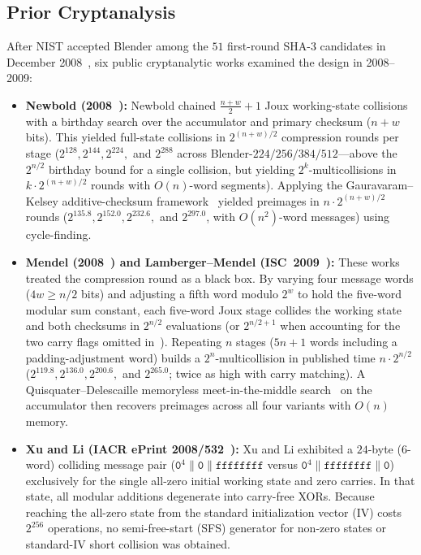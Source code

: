 \documentclass[11pt,a4paper]{article}
\theoremstyle{definition}
\theoremstyle{remark}
\begin{document}
\subsection{Prior Cryptanalysis}
After NIST accepted Blender among the $51$ first-round SHA-3 candidates in December 2008~\cite{NIST09}, six public cryptanalytic works examined the design in 2008--2009:
\begin{itemize}[leftmargin=2em]
    \item \textbf{Newbold (2008~\cite{New08}):} Newbold chained $\frac{n+w}{2} + 1$ Joux working-state collisions~\cite{Jou04} with a birthday search over the accumulator and primary checksum ($n + w$ bits). This yielded full-state collisions in $2^{(n+w)/2}$ compression rounds per stage ($2^{128}, 2^{144}, 2^{224},$ and $2^{288}$ across Blender-$224/256/384/512$---above the $2^{n/2}$ birthday bound for a single collision, but yielding $2^k$-multicollisions in $k \cdot 2^{(n+w)/2}$ rounds with $O(n)$-word segments). Applying the Gauravaram--Kelsey additive-checksum framework~\cite{GK08} yielded preimages in $n \cdot 2^{(n+w)/2}$ rounds ($2^{135.8}, 2^{152.0}, 2^{232.6},$ and $2^{297.0}$, with $O(n^2)$-word messages) using cycle-finding.
    \item \textbf{Mendel (2008~\cite{Men08}) and Lamberger--Mendel (ISC~2009~\cite{LM09}):} These works treated the compression round as a black box. By varying four message words ($4w \ge n/2$ bits) and adjusting a fifth word modulo $2^w$ to hold the five-word modular sum constant, each five-word Joux stage collides the working state and both checksums in $2^{n/2}$ evaluations (or $2^{n/2+1}$ when accounting for the two carry flags omitted in~\cite{LM09}). Repeating $n$ stages ($5n + 1$ words including a padding-adjustment word) builds a $2^n$-multicollision in published time $n \cdot 2^{n/2}$ ($2^{119.8}, 2^{136.0}, 2^{200.6},$ and $2^{265.0}$; twice as high with carry matching). A Quisquater--Delescaille memoryless meet-in-the-middle search~\cite{QD89} on the accumulator then recovers preimages across all four variants with $O(n)$ memory.
    \item \textbf{Xu and Li (IACR ePrint 2008/532~\cite{XL08}):} Xu and Li exhibited a $24$-byte ($6$-word) colliding message pair ($\mathtt{0}^4 \| \mathtt{0} \| \mathtt{ffffffff}$ versus $\mathtt{0}^4 \| \mathtt{ffffffff} \| \mathtt{0}$) exclusively for the single all-zero initial working state and zero carries. In that state, all modular additions degenerate into carry-free XORs. Because reaching the all-zero state from the standard initialization vector (IV) costs $2^{256}$ operations, no semi-free-start (SFS) generator for non-zero states or standard-IV short collision was obtained.

\end{itemize}
\end{document}
